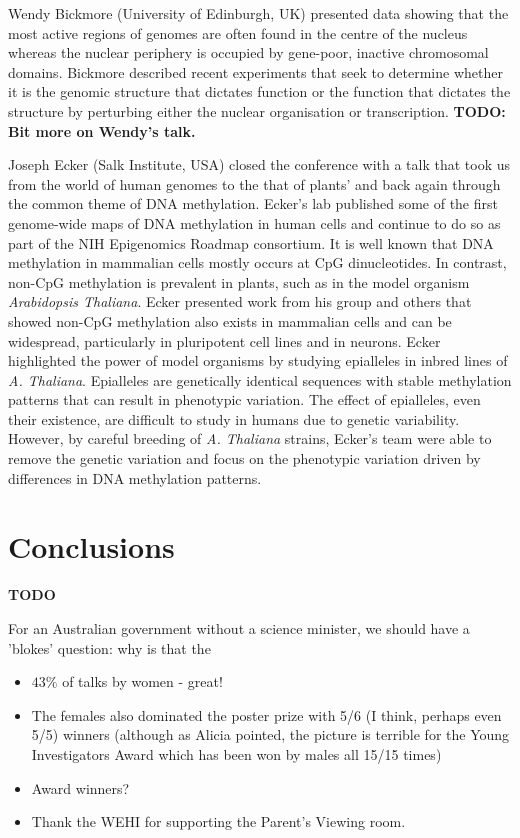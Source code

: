 \documentclass[twocolumn]{bmcart}%
\begin{document}
Wendy Bickmore (University of Edinburgh, UK) presented data showing that the most active regions of genomes are often found in the centre of the nucleus whereas the nuclear periphery is occupied by gene-poor, inactive chromosomal domains. Bickmore described recent experiments that seek to determine whether it is the genomic structure that dictates function or the function that dictates the structure by perturbing either the nuclear organisation or transcription. \textbf{TODO: Bit more on Wendy's talk.}

Joseph Ecker (Salk Institute, USA) closed the conference with a talk that took us from the world of human genomes to the that of plants' and back again through the common theme of DNA methylation. Ecker's lab published some of the first genome-wide maps of DNA methylation in human cells and continue to do so as part of the NIH Epigenomics Roadmap consortium. It is well known that DNA methylation in mammalian cells mostly occurs at CpG dinucleotides.  In contrast, non-CpG methylation is prevalent in plants, such as in the model organism \emph{Arabidopsis Thaliana}. Ecker presented work from his group and others that showed non-CpG methylation also exists in mammalian cells and can be widespread, particularly in pluripotent cell lines and in neurons. Ecker highlighted the power of model organisms by studying epialleles in inbred lines of \emph{A. Thaliana}. Epialleles are genetically identical sequences with stable methylation patterns that can result in phenotypic variation. The effect of epialleles, even their existence, are difficult to study in humans due to genetic variability. However, by careful breeding of \emph{A. Thaliana} strains,  Ecker's team were able to remove the genetic variation and focus on the phenotypic variation driven by differences in DNA methylation patterns.

\section*{Conclusions}
\textbf{TODO}

For an Australian government without a science minister, we should have a 'blokes' question: why is that the 

\begin{itemize}
 \item $43\%$ of talks by women - great!
 \item The females also dominated the poster prize with 5/6 (I think, perhaps even 5/5) winners (although as Alicia pointed, the picture is terrible for the Young Investigators Award which has been won by males all 15/15 times)
 \item Award winners?
 \item Thank the WEHI for supporting the Parent's Viewing room.
\end{itemize}
\end{document}
